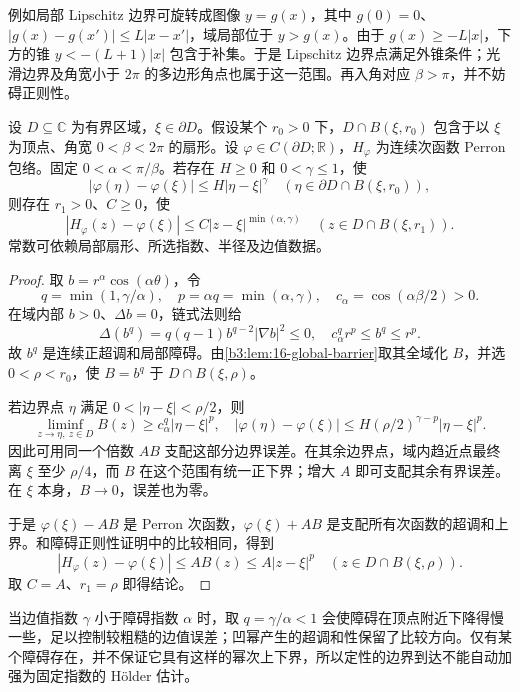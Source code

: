 \ProseParagraphBreak

例如局部 Lipschitz 边界可旋转成图像 \(y=g(x)\)，其中 \(g(0)=0\)、\(|g(x)-g(x')|\le L|x-x'|\)，域局部位于 \(y>g(x)\)。由于 \(g(x)\ge-L|x|\)，下方的锥 \(y<-(L+1)|x|\) 包含于补集。于是 Lipschitz 边界点满足外锥条件；光滑边界及角宽小于 \(2\pi\) 的多边形角点也属于这一范围。再入角对应 \(\beta>\pi\)，并不妨碍正则性。

\begin{proposition}\label{b3:prop:16-corner-holder}
设 \(D\subseteq\mathbb C\) 为有界区域，\(\xi\in\partial D\)。假设某个 \(r_0>0\) 下，\(D\cap B(\xi,r_0)\) 包含于以 \(\xi\) 为顶点、角宽 \(0<\beta<2\pi\) 的扇形。设 \(\varphi\in C(\partial D;\mathbb R)\)，\(H_\varphi\) 为连续次函数 Perron 包络。固定 \(0<\alpha<\pi/\beta\)。若存在 \(H\ge0\) 和 \(0<\gamma\le1\)，使
\[
 |\varphi(\eta)-\varphi(\xi)|\le H|\eta-\xi|^\gamma
 \quad\left(\eta\in\partial D\cap B(\xi,r_0)\right),
\]
则存在 \(r_1>0\)、\(C\ge0\)，使
\[
 |H_\varphi(z)-\varphi(\xi)|
 \le C|z-\xi|^{\min(\alpha,\gamma)}
 \quad\left(z\in D\cap B(\xi,r_1)\right).
\]
常数可依赖局部扇形、所选指数、半径及边值数据。
\end{proposition}
\begin{proof}
取 \(b=r^\alpha\cos(\alpha\theta)\)，令
\[
 q=\min(1,\gamma/\alpha),\quad p=\alpha q=\min(\alpha,\gamma),
 \quad c_\alpha=\cos(\alpha\beta/2)>0.
\]
在域内部 \(b>0\)、\(\Delta b=0\)，链式法则给
\[
 \Delta(b^q)=q(q-1)b^{q-2}|\nabla b|^2\le0,
 \quad c_\alpha^q r^p\le b^q\le r^p.
\]
故 \(b^q\) 是连续正超调和局部障碍。由\cref{b3:lem:16-global-barrier}取其全域化 \(B\)，并选 \(0<\rho<r_0\)，使 \(B=b^q\) 于 \(D\cap B(\xi,\rho)\)。

若边界点 \(\eta\) 满足 \(0<|\eta-\xi|<\rho/2\)，则
\[
 \liminf_{z\to\eta,\ z\in D}B(z)
 \ge c_\alpha^q|\eta-\xi|^p,
 \quad
 |\varphi(\eta)-\varphi(\xi)|
 \le H(\rho/2)^{\gamma-p}|\eta-\xi|^p.
\]
因此可用同一个倍数 \(A B\) 支配这部分边界误差。在其余边界点，域内趋近点最终离 \(\xi\) 至少 \(\rho/4\)，而 \(B\) 在这个范围有统一正下界；增大 \(A\) 即可支配其余有界误差。在 \(\xi\) 本身，\(B\to0\)，误差也为零。

于是 \(\varphi(\xi)-AB\) 是 Perron 次函数，\(\varphi(\xi)+AB\) 是支配所有次函数的超调和上界。和障碍正则性证明中的比较相同，得到
\[
 |H_\varphi(z)-\varphi(\xi)|\le AB(z)\le A|z-\xi|^p
 \quad\left(z\in D\cap B(\xi,\rho)\right).
\]
取 \(C=A\)、\(r_1=\rho\) 即得结论。
\end{proof}
当边值指数 \(\gamma\) 小于障碍指数 \(\alpha\) 时，取 \(q=\gamma/\alpha<1\) 会使障碍在顶点附近下降得慢一些，足以控制较粗糙的边值误差；凹幂产生的超调和性保留了比较方向。仅有某个障碍存在，并不保证它具有这样的幂次上下界，所以定性的边界到达不能自动加强为固定指数的 Hölder 估计。

